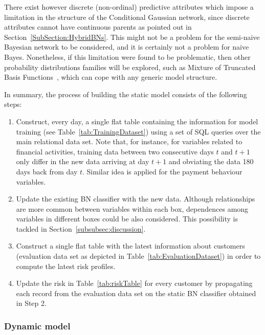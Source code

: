 There exist however discrete (non-ordinal) predictive attributes which impose a limitation in the structure of the Conditional Gaussian network, since discrete attributes cannot have continuous parents as pointed out in Section~\ref{SubSection:HybridBNs}. This might not be a problem for the semi-naive Bayesian network to be considered, and it is certainly not a problem for naive Bayes. Nonetheless, if this limitation were found to be problematic, then other probability distributions families will be explored, such as Mixture of Truncated Basis Functions~\cite{Lan12}, which can cope with any generic model structure. 

In summary, the process of building the static model consists of the following steps:

\begin{enumerate}
\item Construct, every day, a single flat table containing the information for model training (see Table~\ref{tab:TrainingDataset}) using a set of SQL queries over the main relational data set. Note that, for instance, for variables related to financial activities, training data between two consecutive days $t$ and $t+1$ only differ in the new data arriving at day $t+1$ and obviating the data 180 days back from day $t$. Similar idea is applied for the payment behaviour variables.
\item Update the existing BN classifier with the new data. Although relationships are more common between variables within each box, dependences among variables in different boxes could be also considered. This possibility is tackled in Section~\ref{subsubsec:discussion}.
\item Construct a single flat table with the latest information about customers (evaluation data set as depicted in Table~\ref{tab:EvaluationDataset}) in order to compute the latest risk profiles. 
\item Update the risk in Table~\ref{tab:riskTable} for every customer by propagating each record from the evaluation data set on the static BN classifier obtained in Step 2. 
\end{enumerate}

\subsubsection*{Dynamic model} 

